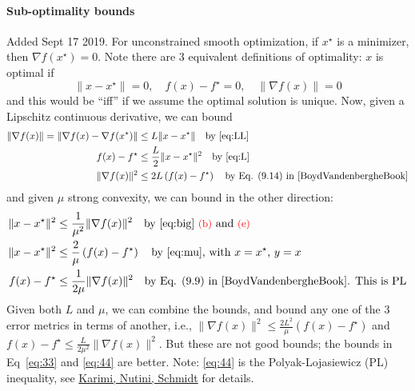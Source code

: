 \documentclass{article}
\newcommand{\<}{\langle}
\renewcommand{\>}{\rangle}
\begin{document}
\paragraph{Sub-optimality bounds} Added Sept 17 2019.  For unconstrained smooth optimization, if $x^\star$ is a minimizer, then $\nabla f(x^\star) = 0$. Note there are 3 equivalent definitions of optimality: $x$ is optimal if
\begin{equation}
    \|x - x^\star\|=0, \quad
    f(x) - f^\star = 0, \quad
    \|\nabla f(x)\| = 0
\end{equation}
and this would be ``iff'' if we assume the optimal solution is unique. Now, given a Lipschitz continuous derivative, we can bound
\begin{align}
 \|\nabla f(x) \| = \| \nabla f(x) - \nabla f(x^\star)\| &\le L \|x-x^\star\| \quad \text{by \eqref{eq:LL}}\\
 f(x) - f^\star &\le \frac{L}{2}\|x-x^\star\|^2
 \quad\text{by \eqref{eq:L}} \\
 \|\nabla f(x) \|^2 &\le 2L \left( f(x) - f^\star\right) \quad\text{by Eq. (9.14) in \cite{BoydVandenbergheBook}} \label{eq:33}
\end{align}
and given $\mu$ strong convexity, we can bound in the other direction:
\begin{align}
\|x-x^\star\|^2 &\le \frac{1}{\mu^2}\|\nabla f(x)\|^2 
\quad \text{by \eqref{eq:big}  {\small\textcolor{red}{(b)}} and  {\small\textcolor{red}{(e)}} }
\\
\|x-x^\star\|^2 &\le \frac{2}{\mu}\left( f(x) - f^\star\right)
\quad \text{by \eqref{eq:mu}, with $x=x^\star$, $y=x$} \\
f(x) - f^\star &\le \frac{1}{2\mu}\|\nabla f(x)\|^2 \quad\text{by Eq. (9.9) in \cite{BoydVandenbergheBook}. This is PL}
\label{eq:44}
\end{align}
Given both $L$ and $\mu$, we can combine the bounds, and bound any one of the 3 error metrics in terms of another, i.e.,
 $\|\nabla f(x) \|^2 \le \frac{2L^2}{\mu}\left( f(x) - f^\star\right)$ and $%
 f(x) - f^\star \le \frac{L}{2\mu^2}\|\nabla f(x)\|^2. $
But these are not good bounds; the bounds in Eq~\eqref{eq:33} and \eqref{eq:44} are better. Note: \eqref{eq:44} is the Polyak-Lojasiewicz (PL) inequality, see \href{https://arxiv.org/abs/1608.04636}{Karimi, Nutini, Schmidt} for details.
\end{document}
